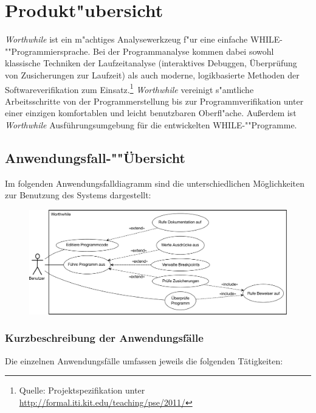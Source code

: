 \section{Produkt"ubersicht}%

\textit{Worthwhile} ist ein m"achtiges Analysewerkzeug f"ur eine einfache WHILE-""Programmiersprache. Bei der Programmanalyse kommen dabei sowohl klassische Techniken der Laufzeitanalyse (interaktives Debuggen, Überprüfung von Zusicherungen zur Laufzeit) als auch moderne, logikbasierte Methoden der Softwareverifikation zum Einsatz.\footnote{Quelle: Projektspezifikation unter \url{http://formal.iti.kit.edu/teaching/pse/2011/}} \textit{Worthwhile} vereinigt s"amtliche Arbeitsschritte von der Programmerstellung bis zur Programmverifikation unter einer einzigen komfortablen und leicht benutzbaren Oberfl"ache. Außerdem ist \textit{Worthwhile} Ausführungsumgebung für die entwickelten WHILE-""Programme.%

\subsection{Anwendungsfall-""Übersicht}

Im folgenden Anwendungsfalldiagramm sind die unterschiedlichen Möglichkeiten zur Benutzung des Systems dargestellt:

\begin{figure}[H]
	\includegraphics[width=\textwidth]{usecase/usecase.pdf}
\end{figure}

\subsubsection{Kurzbeschreibung der Anwendungsfälle}

Die einzelnen Anwendungsfälle umfassen jeweils die folgenden Tätigkeiten:

